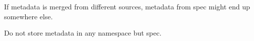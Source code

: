 If metadata is merged from different sources, metadata from spec might end up somewhere else.

Do not store metadata in any namespace but spec.